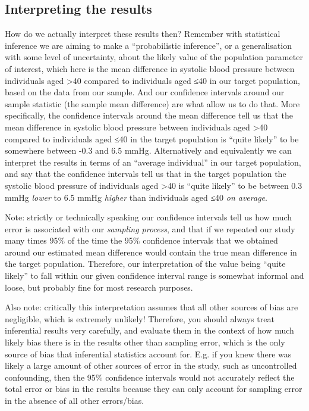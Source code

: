 \documentclass[
]{book}
\begin{document}
\hypertarget{interpreting-the-results}{%
\subsection{Interpreting the results}\label{interpreting-the-results}}

How do we actually interpret these results then? Remember with statistical inference we are aiming to make a ``probabilistic inference'', or a generalisation with some level of uncertainty, about the likely value of the population parameter of interest, which here is the mean difference in systolic blood pressure between individuals aged \textgreater40 compared to individuals aged ≤40 in our target population, based on the data from our sample. And our confidence intervals around our sample statistic (the sample mean difference) are what allow us to do that. More specifically, the confidence intervals around the mean difference tell us that the mean difference in systolic blood pressure between individuals aged \textgreater40 compared to individuals aged ≤40 in the target population is ``quite likely'' to be somewhere between -0.3 and 6.5 mmHg. Alternatively and equivalently we can interpret the results in terms of an ``average individual'' in our target population, and say that the confidence intervals tell us that in the target population the systolic blood pressure of individuals aged \textgreater40 is ``quite likely'' to be between 0.3 mmHg \emph{lower} to 6.5 mmHg \emph{higher} than individuals aged ≤40 \emph{on average}.

Note: strictly or technically speaking our confidence intervals tell us how much error is associated with our \emph{sampling process}, and that if we repeated our study many times 95\% of the time the 95\% confidence intervals that we obtained around our estimated mean difference would contain the true mean difference in the target population. Therefore, our interpretation of the value being ``quite likely'' to fall within our given confidence interval range is somewhat informal and loose, but probably fine for most research purposes.

Also note: critically this interpretation assumes that all other sources of bias are negligible, which is extremely unlikely! Therefore, you should always treat inferential results very carefully, and evaluate them in the context of how much likely bias there is in the results other than sampling error, which is the only source of bias that inferential statistics account for. E.g. if you knew there was likely a large amount of other sources of error in the study, such as uncontrolled confounding, then the 95\% confidence intervals would not accurately reflect the total error or bias in the results because they can only account for sampling error in the absence of all other errors/bias.
\end{document}

